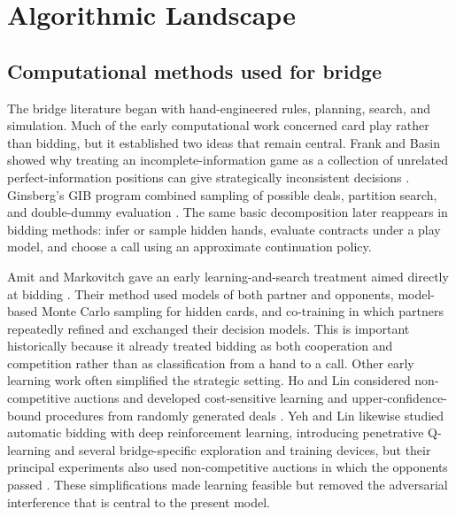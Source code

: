 \documentclass[11pt]{article}
\begin{document}
\section{Algorithmic Landscape}

\subsection{Computational methods used for bridge}

The bridge literature began with hand-engineered rules, planning, search, and simulation. Much of the early computational work concerned card play rather than bidding, but it established two ideas that remain central. Frank and Basin showed why treating an incomplete-information game as a collection of unrelated perfect-information positions can give strategically inconsistent decisions \cite{frank1998search}. Ginsberg's GIB program combined sampling of possible deals, partition search, and double-dummy evaluation \cite{ginsberg2001gib}. The same basic decomposition later reappears in bidding methods: infer or sample hidden hands, evaluate contracts under a play model, and choose a call using an approximate continuation policy.

Amit and Markovitch gave an early learning-and-search treatment aimed directly at bidding \cite{amit2006learning}. Their method used models of both partner and opponents, model-based Monte Carlo sampling for hidden cards, and co-training in which partners repeatedly refined and exchanged their decision models. This is important historically because it already treated bidding as both cooperation and competition rather than as classification from a hand to a call. Other early learning work often simplified the strategic setting. Ho and Lin considered non-competitive auctions and developed cost-sensitive learning and upper-confidence-bound procedures from randomly generated deals \cite{ho2015learning}. Yeh and Lin likewise studied automatic bidding with deep reinforcement learning, introducing penetrative Q-learning and several bridge-specific exploration and training devices, but their principal experiments also used non-competitive auctions in which the opponents passed \cite{yeh2016automatic}. These simplifications made learning feasible but removed the adversarial interference that is central to the present model.
\end{document}
